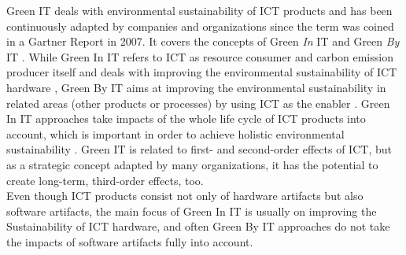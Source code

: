 \documentclass[oribibl]{llncs}
\begin{document}
Green IT deals with environmental sustainability of ICT products and has been continuously adapted by companies and organizations %
since the term was coined in a Gartner Report %
\cite{gartner07} in 2007. It covers the concepts of Green \textit{In} IT and Green \textit{By} IT \cite{hilty11}. While Green In IT refers to ICT as resource consumer and carbon emission producer itself and deals with improving the environmental sustainability of ICT hardware \cite{calero_green_2015}, Green By IT aims at improving the environmental sustainability in related areas (other products or processes) by using ICT as the enabler \cite{hilty11}. Green In IT approaches take impacts of the whole life cycle of ICT products into account, which is important in order to achieve holistic environmental sustainability \cite{hilty11}. Green IT is related to first- and second-order effects of ICT, but as a strategic concept adapted by many organizations, it has the potential to create long-term, third-order effects, too.\\
Even though ICT products consist not only of hardware artifacts but also software artifacts, the main focus of Green In IT is usually on improving the Sustainability of ICT hardware, %
and often Green By IT approaches do not take the impacts of software artifacts fully into account. %
\end{document}
